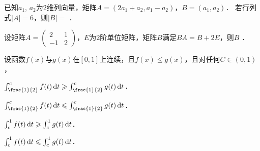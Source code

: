 \documentclass[plain,noanswer,medmath]{../../template/jnuexam}
\begin{document}












\begin{problem}
已知$a_1$, $a_2$为$2$维列向量，矩阵$A = (2a_1 + a_2,a_1 - a_2)$，$B = (a_1,a_2)$．
若行列式$|A| = 6$，则$|B| =$ \fillin{}．
\end{problem}


\begin{problem}
设矩阵$A = \begin{pmatrix}
   2 & 1 \\
  -1 & 2
\end{pmatrix}$，$E$为$2$阶单位矩阵，矩阵$B$满足$BA = B + 2E$，则$B$ \fillin{}．
\end{problem}










\begin{problem}
设函数$f(x)$与$g(x)$在$[0,1]$上连续，且$f(x) \le g(x)$，且对任何$C\in(0,1)$，\pickout{}
\begin{abcd}
\item $\int_{\frac{1}{2}}^c f(t)\dt \ge \int_{\frac{1}{2}}^c g(t)\dt$．
\item $\int_{\frac{1}{2}}^c f(t)\dt \le \int_{\frac{1}{2}}^c g(t)\dt$．
\item $\int_c^1 f(t)\mathop{}\!\mathrm{d} t \geqslant \int_c^1 g(t)\mathop{}\!\mathrm{d} t$．
\item $\int_c^1 f(t)\mathop{}\!\mathrm{d} t \leqslant \int_c^1 g(t)\mathop{}\!\mathrm{d} t$．
\end{abcd}
\end{problem}








\end{document}
